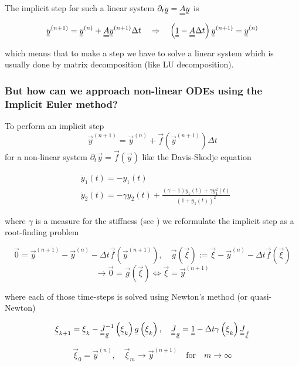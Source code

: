 The implicit step for such a linear system $\partial_t \vec{y} = \mat{A} \vec{y}$ is

\[
  \vec{y}^{(n+1)} = \vec{y}^{(n)} + \mat{A} \vec{y}^{(n+1)} \Delta t \quad \Rightarrow \quad \left( \mat{1} - \mat{A} \Delta t \right) \vec{y}^{(n+1)} = \vec{y}^{(n)}
\]

which means that to make a step we have to solve a linear system which is usually done by matrix decomposition (like LU decomposition).

\subsubsection*{But how can we approach non-linear ODEs using the Implicit Euler method?}
To perform an implicit step 
\[
  \vec{y}^{(n+1)} = \vec{y}^{(n)} + \vec{f} \left( \vec{y}^{(n+1)} \right) \Delta t
\]
for a non-linear system $\partial_t \vec{y} = \vec{f} \left( \vec{y} \right)$ like the Davis-Skodje equation

\[ 
\begin{aligned}
& \dot{y}_1(t)=-y_1(t) \\
& \dot{y}_2(t)=-\gamma y_2(t)+\frac{(\gamma-1) y_1(t)+\gamma y_1^2(t)}{\left(1+y_1(t)\right)^2}
\end{aligned}
\]

where $\gamma$ is a measure for the stiffness (see \cite[chapter 2.4]{heiter12}) we reformulate the implicit step as a root-finding problem

\[
  \vec{0} = \vec{y}^{(n+1)} - \vec{y}^{(n)} - \Delta t \vec{f} \left( \vec{y}^{(n+1)} \right), \quad \vec{g} \left( \vec{\xi} \right) := \vec{\xi} - \vec{y}^{(n)} - \Delta t \vec{f} \left( \vec{\xi} \right)
\]
\[
  \rightarrow \vec{0} = \vec{g} \left( \vec{\xi} \right) \Leftrightarrow \vec{\xi} = \vec{y}^{(n+1)}
\]

where each of those time-steps is solved using Newton's method (or quasi-Newton)


\[
  \vec{\xi}_{k+1} = \vec{\xi}_k - \mat{J}_{\vec{g}}^{-1} \left( \vec{\xi}_k \right) \vec{g} \left( \vec{\xi}_k \right), \quad \mat{J}_{\vec{g}} = \mat{1} - \Delta t \gamma \left( \vec{\xi}_k \right) \mat{J}_{\vec{f}}
\]

\[
  \vec{\xi}_0 = \vec{y}^{(n)}, \quad \vec{\xi}_m \rightarrow \vec{y}^{(n+1)} \quad \text{for} \quad m \rightarrow \infty
\]
  
